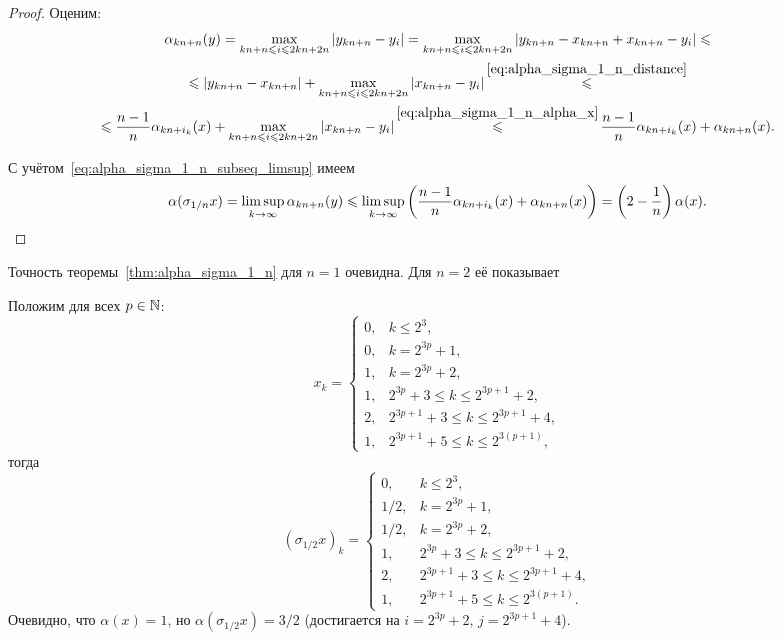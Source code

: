 \begin{proof}
	Оценим:
	\begin{multline}
		\alpha_{kn+n}(y)
		=
		\max_{kn+n \leq i \leq 2kn+2n } |y_{kn+n} - y_i|
		=
		\max_{kn+n \leq i \leq 2kn+2n } |y_{kn+n} - x_{kn+n} + x_{kn+n} - y_i|
		\leq
		\\\leq
		|y_{kn+n} - x_{kn+n}| + \max_{kn+n \leq i \leq 2kn+2n } |x_{kn+n} - y_i|
		\mathop{\leq}^{\eqref{eq:alpha_sigma_1_n_distance}}
		\\\leq
		\frac{n-1}{n} \alpha_{kn+i_k}(x) + \max_{kn+n \leq i \leq 2kn+2n } |x_{kn+n} - y_i|
		\mathop{\leq}^{\eqref{eq:alpha_sigma_1_n_alpha_x}}
		\frac{n-1}{n} \alpha_{kn+i_k}(x)+\alpha_{kn+n}(x)
		.
	\end{multline}

	С учётом~\eqref{eq:alpha_sigma_1_n_subseq_limsup} имеем
	\begin{multline}
		\alpha(\sigma_{1/n}x)
		=
		\varlimsup_{k\to\infty} \alpha_{kn+n}(y)
		\leq
		\varlimsup_{k\to\infty} \left( \frac{n-1}{n} \alpha_{kn+i_k}(x)+\alpha_{kn+n}(x) \right)
		=
		\left(2-\frac{1}{n}\right)\alpha(x)
		.
	\end{multline}
\end{proof}

Точность теоремы~\ref{thm:alpha_sigma_1_n} для $n=1$ очевидна.
Для $n=2$ её показывает
\begin{example}
	Положим для всех $p\in\N$:
	\begin{equation}
		x_k=\begin{cases}
			0, & k \leq 2^3, \\
			0, & k = 2^{3p}+1, \\
			1, & k = 2^{3p}+2, \\
			1, & 2^{3p}+3 \leq k \leq 2^{3p+1}+2, \\
			2, & 2^{3p+1}+3 \leq k \leq 2^{3p+1}+4, \\
			1, & 2^{3p+1}+5 \leq k \leq 2^{3(p+1)},
		\end{cases}
	\end{equation}
	тогда
	\begin{equation}
		(\sigma_{1/2}x)_k=\begin{cases}
			0, & k \leq 2^3, \\
			1/2, & k = 2^{3p}+1, \\
			1/2, & k = 2^{3p}+2, \\
			1, & 2^{3p}+3 \leq k \leq 2^{3p+1}+2, \\
			2, & 2^{3p+1}+3 \leq k \leq 2^{3p+1}+4, \\
			1, & 2^{3p+1}+5 \leq k \leq 2^{3(p+1)}.
		\end{cases}
	\end{equation}
	Очевидно, что $\alpha(x)=1$, но $\alpha(\sigma_{1/2}x)=3/2$
	(достигается на $i=2^{3p}+2$, $j=2^{3p+1}+4$).
\end{example}
